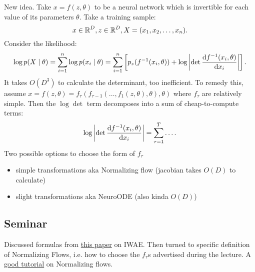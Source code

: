 New idea. Take $x = f(z, \theta)$ to be a neural network which is invertible for each value of its parameters $\theta$.
Take a training sample:
\[
x \in \operatorname{\mathbb{R}}^D, z \in \operatorname{\mathbb{R}}^D, X = (x_1, x_2, \ldots, x_n)
.\]
Consider the likelihood:
\[
\log p(X \mid \theta) = \sum_{i=1}^{n} \log p(x_i \mid \theta) = 
\sum_{i=1}^{n} \left[ p_z(f^{-1}(x_i, \theta)) + \log\abs{\det \dv{f^{-1}(x_i, \theta)}{x_i}} \right]
.\]
It takes $O(D^3)$ to calculate the determinant, too inefficient.
To remedy this, assume $x=f(z, \theta) = f_{\tau}(f_{\tau-1}(\ldots, f_1(z, \theta), \theta), \theta)$ where $f_{\tau}$ are relatively simple.
Then the $\log\det$ term decomposes into a sum of cheap-to-compute terms:
\[
\log\abs{\det \dv{f^{-1}(x_i, \theta)}{x_i}} = \sum_{\tau=1}^{T} \ldots
.\]
Two possible options to choose the form of $f_{\tau}$
\begin{itemize}
\item simple transformations aka Normalizing flow (jacobian takes $O(D)$ to calculate)
\item slight transformations aka NeuroODE (also kinda $O(D)$)
\end{itemize}

\subsection{Seminar}

Discussed formulas from \href{https://casmls.github.io/general/2017/04/24/iwae-aae.html}{this paper} on IWAE.
Then turned to specific definition of Normalizing Flows, i.e. how to choose the $f_{\tau}$s advertised during the lecture.
A \href{https://arxiv.org/pdf/1908.09257.pdf}{good tutorial} on Normalizing flows.
